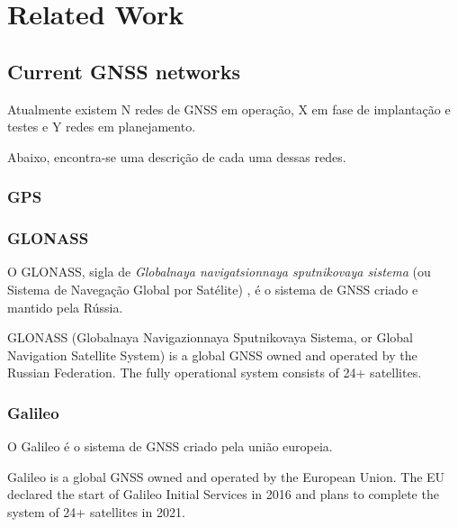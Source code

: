 %
%
%
%
%

%
%
%
%
%


\chapter{Related Work} \label{ch:related-work}

\section{Current GNSS networks}

Atualmente existem N redes de GNSS em operação, X em fase de implantação e testes e Y redes em planejamento.

Abaixo, encontra-se uma descrição de cada uma dessas redes.

\subsection{GPS}

\cite{gps}

\subsection{GLONASS}

O GLONASS, sigla de \textit{Globalnaya navigatsionnaya sputnikovaya sistema} (ou Sistema de Navegação Global por Satélite) \cite{glonass}, é o sistema de GNSS criado e mantido pela Rússia.

GLONASS (Globalnaya Navigazionnaya Sputnikovaya Sistema, or Global Navigation Satellite System) is a global GNSS owned and operated by the Russian Federation. The fully operational system consists of 24+ satellites.

\subsection{Galileo}

O Galileo é o sistema de GNSS criado pela união europeia.

Galileo is a global GNSS owned and operated by the European Union. The EU declared the start of Galileo Initial Services in 2016 and plans to complete the system of 24+ satellites in 2021.

